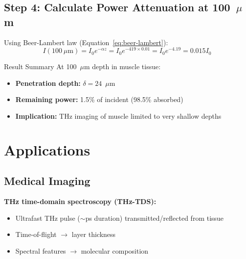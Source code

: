 \subsection*{Step 4: Calculate Power Attenuation at 100~$\mu$m}

Using Beer-Lambert law (Equation~\ref{eq:beer-lambert}):
\begin{equation}
I(100~\mu\text{m}) = I_0 e^{-\alpha z} = I_0 e^{-419 \times 0.01} = I_0 e^{-4.19} = 0.015 I_0
\end{equation}

\begin{calloutbox}[colback=black!8!white,colframe=black]{Result Summary}
At 100~$\mu$m depth in muscle tissue:
\begin{itemize}
\item \textbf{Penetration depth:} $\delta = 24$~$\mu$m
\item \textbf{Remaining power:} 1.5\% of incident (98.5\% absorbed)
\item \textbf{Implication:} THz imaging of muscle limited to very shallow depths
\end{itemize}
\end{calloutbox}

\section{Applications}
\label{sec:applications}

\subsection{Medical Imaging}
\label{subsec:medical-imaging}

\textbf{THz time-domain spectroscopy (THz-TDS):}
\begin{itemize}
\item Ultrafast THz pulse ($\sim$ps duration) transmitted/reflected from tissue
\item Time-of-flight $\rightarrow$ layer thickness
\item Spectral features $\rightarrow$ molecular composition
\end{itemize}

